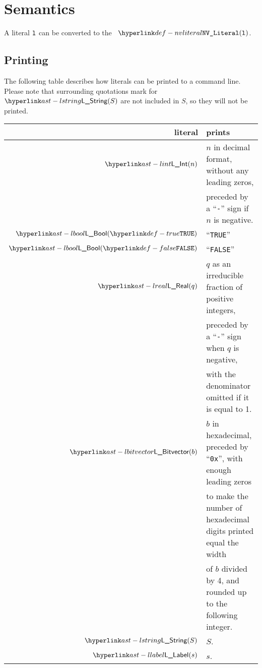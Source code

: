 \section{Semantics}
A literal $\texttt{l}$ can be converted to the \nativevalue\ $\nvliteral{\vl}$.

\subsection{Printing}%
\hypertarget{def-outputtoconsole}{}

The following table describes how literals can be printed to a command line.
%
Please note that surrounding quotations mark for $\lstring(S)$ are not included
in $S$, so they will not be printed.

\begin{tabular}{rl}
  \textbf{literal} & \textbf{prints} \\
  \hline
  $\lint(n)$ & $n$ in decimal format, without any leading zeros, \\
             & preceded by a ``\texttt{-}'' sign if $n$ is negative. \\
  $\lbool(\True)$ & ``\texttt{TRUE}'' \\
  $\lbool(\False)$ & ``\texttt{FALSE}'' \\
  $\lreal(q)$ & $q$ as an irreducible fraction of positive integers, \\
              & preceded by a ``\texttt{-}'' sign when $q$ is negative, \\
              & with the denominator omitted if it is equal to 1. \\
  $\lbitvector(b)$ & $b$ in hexadecimal, preceded by ``\texttt{0x}'', with enough leading zeros \\
                   & to make the number of hexadecimal digits printed equal the width \\
                   & of $b$ divided by 4, and rounded up to the following integer. \\
  $\lstring(S)$ & $S$. \\
  $\llabel(s)$ & $s$. \\
\end{tabular}

